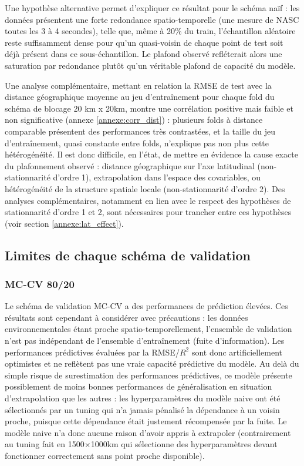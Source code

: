 Une hypothèse alternative permet d'expliquer ce résultat pour le schéma naïf : les données présentent une forte redondance spatio-temporelle (une mesure de NASC toutes les 3 à 4 secondes), telle que, même à 20\% du train, l'échantillon aléatoire reste suffisamment dense pour qu'un quasi-voisin de chaque point de test soit déjà présent dans ce sous-échantillon. Le plafond observé refléterait alors une saturation par redondance plutôt qu'un véritable plafond de capacité du modèle.

Une analyse complémentaire, mettant en relation la RMSE de test avec la distance géographique moyenne au jeu d'entraînement pour chaque fold du schéma de blocage 20 km x 20km, montre une corrélation positive mais faible et non significative (annexe \ref{annexe:corr_dist}) : plusieurs folds à distance comparable présentent des performances très contrastées, et la taille du jeu d'entraînement, quasi constante entre folds, n'explique pas non plus cette hétérogénéité. Il est donc difficile, en l'état, de mettre en évidence la cause exacte du plafonnement observé : distance géographique sur l'axe latitudinal (non-stationnarité d'ordre 1), extrapolation dans l'espace des covariables, ou hétérogénéité de la structure spatiale locale (non-stationnarité d'ordre 2). Des analyses complémentaires, notamment en lien avec le respect des hypothèses de stationnarité d'ordre 1 et 2, sont nécessaires pour trancher entre ces hypothèses (voir section \ref{annexe:lat_effect}).

\subsection{Limites de chaque schéma de validation}
\subsubsection{MC-CV 80/20}
Le schéma de validation MC-CV a des performances de prédiction élevées. Ces résultats sont cependant à considérer avec précautions : les données environnementales étant proche spatio-temporellement, l'ensemble de validation n'est pas indépendant de l'ensemble d'entraînement (fuite d'information). Les performances prédictives évaluées par la RMSE/$R^{2}$ sont donc artificiellement optimistes et ne reflètent pas une vraie capacité prédictive du modèle. Au delà du simple risque de surestimation des performances prédictives, ce modèle présente possiblement de moins bonnes performances de généralisation en situation d'extrapolation que les autres : les hyperparamètres du modèle naive ont été sélectionnés par un tuning qui n'a jamais pénalisé la dépendance à un voisin proche, puisque cette dépendance était justement récompensée par la fuite. Le modèle naive n'a donc aucune raison d'avoir appris à extrapoler (contrairement au tuning fait en 1500×1000km qui sélectionne des hyperparamètres devant fonctionner correctement sans point proche disponible). 


